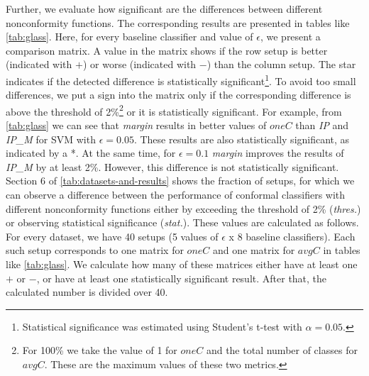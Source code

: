 Further, we evaluate how significant are the differences between different nonconformity 
functions. The corresponding results are presented in tables like \cref{tab:glass}.
Here, for every baseline classifier and value of $\epsilon$, we present a comparison matrix.
A value in the matrix shows if the row setup is better (indicated with $+$) or
worse (indicated with $-$) than the column setup. The star indicates if the 
detected difference is statistically significant\footnote{Statistical significance was 
estimated using Student's t-test with $\alpha = 0.05$.}.
To avoid too small differences, we put a sign into the matrix only if the corresponding
difference is above the threshold of 2\%\footnote{For 100\% we take the value of 1 
for $oneC$ and the total number of classes for $avgC$. These are the maximum values of
these two metrics.} or it is statistically significant.
For example, from \cref{tab:glass} we can see that \textit{margin} results in better values of $oneC$ than
\textit{IP} and \textit{IP\_M} for SVM with $\epsilon=0.05$.
These results are also statistically significant, as indicated by a *.
At the same time, for $\epsilon=0.1$ \textit{margin} improves the results of 
\textit{IP\_M} by at least 2\%.
However, this difference is not statistically significant.
Section 6 of \cref{tab:datasets-and-results} shows the fraction of setups, for which we can observe  a
difference between the performance of conformal classifiers with different nonconformity functions 
either by exceeding the threshold of 2\% (\textit{thres.}) or observing statistical significance (\textit{stat.}). 
These values are calculated as follows. For every dataset, we have 40 setups (5 values of $\epsilon$ x
8 baseline classifiers). Each such setup corresponds to one matrix for $oneC$ and one 
matrix for $avgC$ in tables like \cref{tab:glass}. 
We calculate how many of these matrices either have at least one $+$ or $-$, or have at least one
statistically significant result.
After that, the calculated number is divided over 40.


